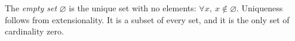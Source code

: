 
The \emph{empty set} $\varnothing$ is the unique set with no elements: $\forall x,\ x\notin\varnothing$. Uniqueness follows from extensionality. It is a subset of every set, and it is the only set of cardinality zero.
